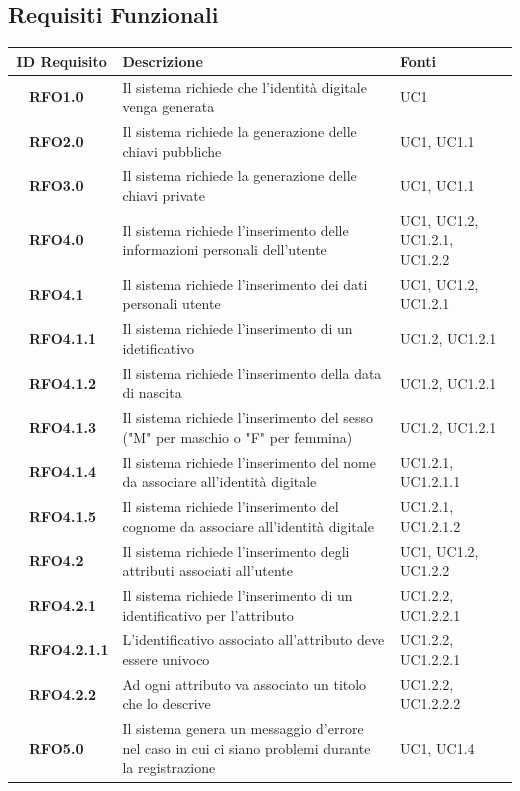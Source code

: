 \subsection{Requisiti Funzionali}
\begin{longtable}{|r l|p{10cm}|p{2cm}|}
	\hline
	\multicolumn{2}{|c|}{\textbf{ID Requisito}} & \textbf{Descrizione} & \textbf{Fonti}\tabularnewline
	\hline
	&\textbf{RFO1.0}&Il sistema richiede che l'identità digitale venga generata&UC1 \\\hline
	&\textbf{RFO2.0}&Il sistema richiede la generazione delle chiavi pubbliche&UC1, UC1.1 \\\hline
	&\textbf{RFO3.0}&Il sistema richiede la generazione delle chiavi private&UC1, UC1.1 \\\hline
	&\textbf{RFO4.0}&Il sistema richiede l'inserimento delle informazioni personali dell'utente&UC1, UC1.2, UC1.2.1, UC1.2.2 \\\hline
	&\textbf{RFO4.1}&Il sistema richiede l'inserimento dei dati personali utente&UC1, UC1.2, UC1.2.1 \\\hline
	&\textbf{RFO4.1.1}&Il sistema richiede l'inserimento di un idetificativo&UC1.2, UC1.2.1 \\\hline
	&\textbf{RFO4.1.2}&Il sistema richiede l'inserimento della data di nascita&UC1.2, UC1.2.1 \\\hline
	&\textbf{RFO4.1.3}&Il sistema richiede l'inserimento del sesso ("M" per maschio o "F" per femmina)&UC1.2, UC1.2.1\\\hline
	&\textbf{RFO4.1.4}&Il sistema richiede l'inserimento del nome da associare all'identità digitale&UC1.2.1, UC1.2.1.1\\\hline
	&\textbf{RFO4.1.5}&Il sistema richiede l'inserimento del cognome da associare all'identità digitale&UC1.2.1, UC1.2.1.2\\\hline
	&\textbf{RFO4.2}&Il sistema richiede l'inserimento degli attributi associati all'utente&UC1, UC1.2, UC1.2.2 \\\hline
	&\textbf{RFO4.2.1}&Il sistema richiede l'inserimento di un identificativo per l'attributo&UC1.2.2, UC1.2.2.1 \\\hline
	&\textbf{RFO4.2.1.1}& L'identificativo associato all'attributo deve essere univoco&UC1.2.2, UC1.2.2.1 \\\hline
	&\textbf{RFO4.2.2}&Ad ogni attributo va associato un titolo che lo descrive&UC1.2.2, UC1.2.2.2 \\\hline
	&\textbf{RFO5.0}&Il sistema genera un messaggio d'errore nel caso in cui ci siano problemi durante la registrazione&UC1, UC1.4 \\\hline

\end{longtable}
